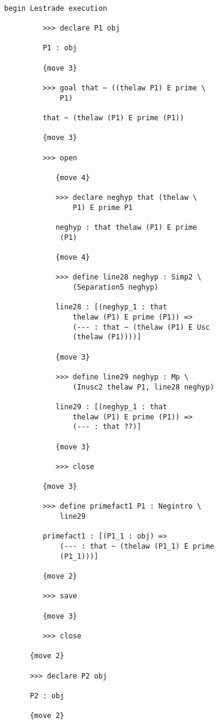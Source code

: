 \documentclass[12pt]{article}
\begin{document}
\begin{verbatim}

begin Lestrade execution

         >>> declare P1 obj

         P1 : obj

         {move 3}

         >>> goal that ~ ((thelaw P1) E prime \
             P1)

         that ~ (thelaw (P1) E prime (P1))

         {move 3}

         >>> open

            {move 4}

            >>> declare neghyp that (thelaw \
                P1) E prime P1

            neghyp : that thelaw (P1) E prime 
             (P1)

            {move 4}

            >>> define line28 neghyp : Simp2 \
                (Separation5 neghyp)

            line28 : [(neghyp_1 : that 
                thelaw (P1) E prime (P1)) => 
                (--- : that ~ (thelaw (P1) E Usc 
                (thelaw (P1))))]

            {move 3}

            >>> define line29 neghyp : Mp \
                (Inusc2 thelaw P1, line28 neghyp)

            line29 : [(neghyp_1 : that 
                thelaw (P1) E prime (P1)) => 
                (--- : that ??)]

            {move 3}

            >>> close

         {move 3}

         >>> define primefact1 P1 : Negintro \
             line29

         primefact1 : [(P1_1 : obj) => 
             (--- : that ~ (thelaw (P1_1) E prime 
             (P1_1)))]

         {move 2}

         >>> save

         {move 3}

         >>> close

      {move 2}

      >>> declare P2 obj

      P2 : obj

      {move 2}


\end{verbatim}
\end{document}
